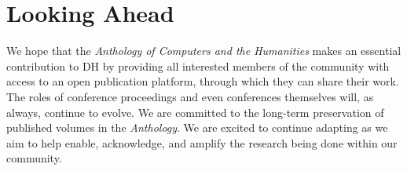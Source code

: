 \documentclass[final]{anthology-ch} %
\begin{document}
\section{Looking Ahead}

We hope that the \emph{Anthology of Computers and the Humanities} makes
an essential contribution to DH by providing all interested members of
the community with access to an open publication platform, through which
they can share their work. The roles of conference proceedings and even
conferences themselves will, as always, continue to evolve. We are
committed to the long-term preservation of published volumes in the
\emph{Anthology}. We are excited to continue adapting as we aim to help
enable, acknowledge, and amplify the research being done within our
community.

\printbibliography
\end{document}
